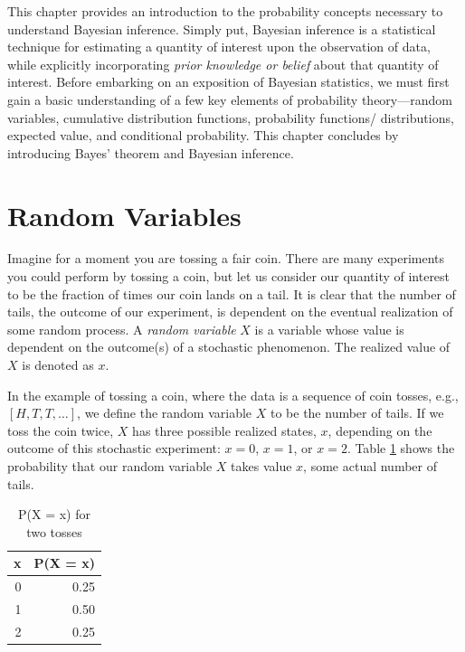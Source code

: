 \documentclass[
  12pt,
  oneside]{book}
\theoremstyle{definition}
\theoremstyle{definition}
\theoremstyle{definition}
\theoremstyle{remark}
\begin{document}
This chapter provides an introduction to the probability concepts necessary to understand Bayesian inference.
Simply put, Bayesian inference is a statistical technique for estimating a quantity of interest upon the observation of data, while explicitly incorporating \emph{prior knowledge or belief} about that quantity of interest.
Before embarking on an exposition of Bayesian statistics, we must first gain a basic understanding of a few key elements of probability theory---random variables, cumulative distribution functions, probability functions/ distributions, expected value, and conditional probability.
This chapter concludes by introducing Bayes' theorem and Bayesian inference.

\hypertarget{random-variables}{%
\section{Random Variables}\label{random-variables}}

Imagine for a moment you are tossing a fair coin.
There are many experiments you could perform by tossing a coin, but let us consider our quantity of interest to be the fraction of times our coin lands on a tail.
It is clear that the number of tails, the outcome of our experiment, is dependent on the eventual realization of some random process.
A \emph{random variable} \(X\) is a variable whose value is dependent on the outcome(s) of a stochastic phenomenon.
The realized value of \(X\) is denoted as \(x\).

In the example of tossing a coin, where the data is a sequence of coin tosses, e.g., \([H, T, T, …]\), we define the random variable \(X\) to be the number of tails.
If we toss the coin twice, \(X\) has three possible realized states, \(x\), depending on the outcome of this stochastic experiment: \(x = 0\), \(x = 1\), or \(x = 2\).
Table \ref{tab:rv} shows the probability that our random variable \(X\) takes value \(x\), some actual number of tails.

\begin{table}[!h]

\caption{\label{tab:rv}P(X = x) for two tosses}
\centering
\begin{tabular}[t]{rr}
\toprule
x & P(X = x)\\
\midrule
0 & 0.25\\
1 & 0.50\\
2 & 0.25\\
\bottomrule
\end{tabular}
\end{table}
\end{document}
